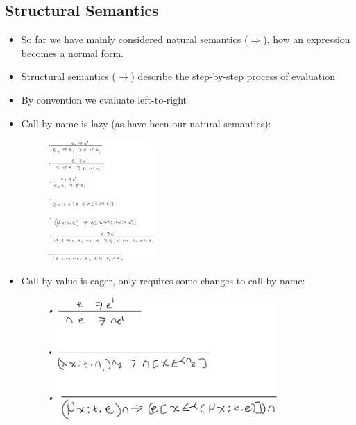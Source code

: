 \documentclass[20pt,a4paper,landscape]{extarticle}
\begin{document}
\begin{flushleft}
\subsection{Structural Semantics}
\begin{itemize}
\item So far we have mainly considered natural semantics ($\Rightarrow$), how an expression becomes a normal form.
\item Structural semantics ($\rightarrow$) describe the step-by-step process of evaluation
\item By convention we evaluate left-to-right
\clearpage
\item Call-by-name is lazy (as have been our natural semantics):
\FloatBarrier
\begin{figure}[h]
\begin{center}
\includegraphics[width=0.38\textwidth]{meta/cs349/CBN_Structural.pdf}{}
\end{center}
\end{figure}
\clearpage
\item Call-by-value is eager, only requires some changes to call-by-name:
\FloatBarrier
\begin{figure}[h]
\begin{center}
\includegraphics[width=0.82\textwidth]{meta/cs349/CBV_Structural.pdf}{}
\end{center}
\end{figure}
\FloatBarrier
\end{itemize}
\clearpage

\end{flushleft}
\end{document}
